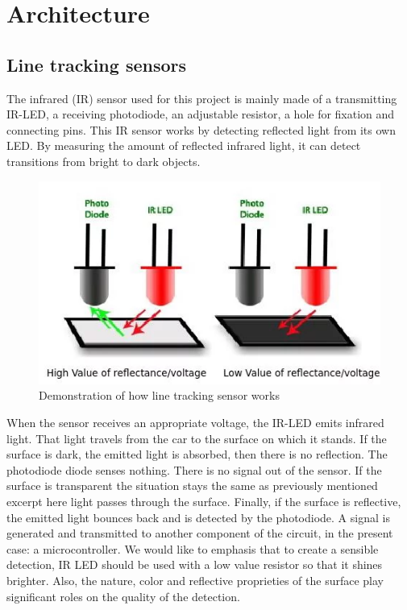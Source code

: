 \documentclass[conference]{IEEEtran}
\begin{document}
\section{Architecture}
\subsection{Line tracking sensors}
The infrared (IR) sensor used for this project is mainly made of a transmitting IR-LED, a receiving photodiode, an adjustable resistor, a hole for fixation and connecting pins. This IR sensor works by detecting reflected light from its own LED. By measuring the amount of reflected infrared light, it can detect transitions from bright to dark objects.
\begin{figure}[h!]
	\includegraphics[width=\linewidth]{LineTrackingSensors.png}
	\caption{Demonstration of how line tracking sensor works}
	\label{fig:UMLSM1}
\end{figure}
When the sensor receives an appropriate voltage, the IR-LED emits infrared light. That light travels from the car to the surface on which it stands. If the surface is dark, the emitted light is absorbed, then there is no reflection. The photodiode diode senses nothing. There is no signal out of the sensor. If the surface is transparent the situation stays the same as previously mentioned excerpt here light passes through the surface. Finally, if the surface is reflective, the emitted light bounces back and is detected by the photodiode. A signal is generated and transmitted to another component of the circuit, in the present case: a microcontroller.  
We would like to emphasis that to create a sensible detection, IR LED should be used with a low value resistor so that it shines brighter. Also, the nature, color and reflective proprieties of the surface play significant roles on the quality of the detection. 
\end{document}
